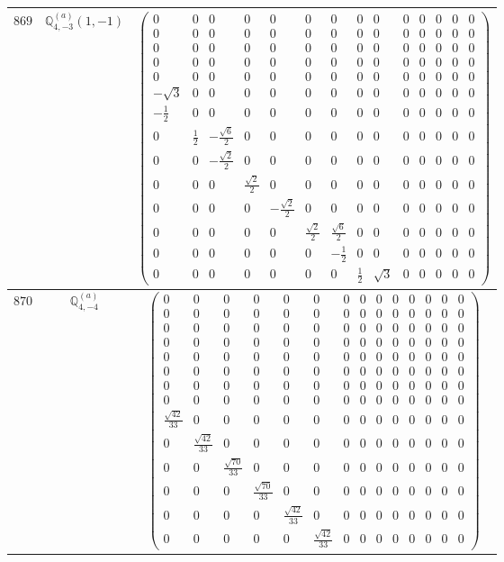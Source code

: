 \documentclass[fleqn,8pt,landscape]{jsarticle}
\begin{document}
\begin{center}
\begin{longtable}{ccc}
$ 869 $ & $ \mathbb{Q}_{4,-3}^{(a)}(1,-1) $ & $ \begin{pmatrix} 0 & 0 & 0 & 0 & 0 & 0 & 0 & 0 & 0 & 0 & 0 & 0 & 0 & 0 \\ 0 & 0 & 0 & 0 & 0 & 0 & 0 & 0 & 0 & 0 & 0 & 0 & 0 & 0 \\ 0 & 0 & 0 & 0 & 0 & 0 & 0 & 0 & 0 & 0 & 0 & 0 & 0 & 0 \\ 0 & 0 & 0 & 0 & 0 & 0 & 0 & 0 & 0 & 0 & 0 & 0 & 0 & 0 \\ 0 & 0 & 0 & 0 & 0 & 0 & 0 & 0 & 0 & 0 & 0 & 0 & 0 & 0 \\ - \sqrt{3} & 0 & 0 & 0 & 0 & 0 & 0 & 0 & 0 & 0 & 0 & 0 & 0 & 0 \\ - \frac{1}{2} & 0 & 0 & 0 & 0 & 0 & 0 & 0 & 0 & 0 & 0 & 0 & 0 & 0 \\ 0 & \frac{1}{2} & - \frac{\sqrt{6}}{2} & 0 & 0 & 0 & 0 & 0 & 0 & 0 & 0 & 0 & 0 & 0 \\ 0 & 0 & - \frac{\sqrt{2}}{2} & 0 & 0 & 0 & 0 & 0 & 0 & 0 & 0 & 0 & 0 & 0 \\ 0 & 0 & 0 & \frac{\sqrt{2}}{2} & 0 & 0 & 0 & 0 & 0 & 0 & 0 & 0 & 0 & 0 \\ 0 & 0 & 0 & 0 & - \frac{\sqrt{2}}{2} & 0 & 0 & 0 & 0 & 0 & 0 & 0 & 0 & 0 \\ 0 & 0 & 0 & 0 & 0 & \frac{\sqrt{2}}{2} & \frac{\sqrt{6}}{2} & 0 & 0 & 0 & 0 & 0 & 0 & 0 \\ 0 & 0 & 0 & 0 & 0 & 0 & - \frac{1}{2} & 0 & 0 & 0 & 0 & 0 & 0 & 0 \\ 0 & 0 & 0 & 0 & 0 & 0 & 0 & \frac{1}{2} & \sqrt{3} & 0 & 0 & 0 & 0 & 0 \end{pmatrix} $ \\ \hline
$ 870 $ & $ \mathbb{Q}_{4,-4}^{(a)} $ & $ \begin{pmatrix} 0 & 0 & 0 & 0 & 0 & 0 & 0 & 0 & 0 & 0 & 0 & 0 & 0 & 0 \\ 0 & 0 & 0 & 0 & 0 & 0 & 0 & 0 & 0 & 0 & 0 & 0 & 0 & 0 \\ 0 & 0 & 0 & 0 & 0 & 0 & 0 & 0 & 0 & 0 & 0 & 0 & 0 & 0 \\ 0 & 0 & 0 & 0 & 0 & 0 & 0 & 0 & 0 & 0 & 0 & 0 & 0 & 0 \\ 0 & 0 & 0 & 0 & 0 & 0 & 0 & 0 & 0 & 0 & 0 & 0 & 0 & 0 \\ 0 & 0 & 0 & 0 & 0 & 0 & 0 & 0 & 0 & 0 & 0 & 0 & 0 & 0 \\ 0 & 0 & 0 & 0 & 0 & 0 & 0 & 0 & 0 & 0 & 0 & 0 & 0 & 0 \\ 0 & 0 & 0 & 0 & 0 & 0 & 0 & 0 & 0 & 0 & 0 & 0 & 0 & 0 \\ \frac{\sqrt{42}}{33} & 0 & 0 & 0 & 0 & 0 & 0 & 0 & 0 & 0 & 0 & 0 & 0 & 0 \\ 0 & \frac{\sqrt{42}}{33} & 0 & 0 & 0 & 0 & 0 & 0 & 0 & 0 & 0 & 0 & 0 & 0 \\ 0 & 0 & \frac{\sqrt{70}}{33} & 0 & 0 & 0 & 0 & 0 & 0 & 0 & 0 & 0 & 0 & 0 \\ 0 & 0 & 0 & \frac{\sqrt{70}}{33} & 0 & 0 & 0 & 0 & 0 & 0 & 0 & 0 & 0 & 0 \\ 0 & 0 & 0 & 0 & \frac{\sqrt{42}}{33} & 0 & 0 & 0 & 0 & 0 & 0 & 0 & 0 & 0 \\ 0 & 0 & 0 & 0 & 0 & \frac{\sqrt{42}}{33} & 0 & 0 & 0 & 0 & 0 & 0 & 0 & 0 \end{pmatrix} $ \\ \hline

\end{longtable}
\end{center}
\end{document}
